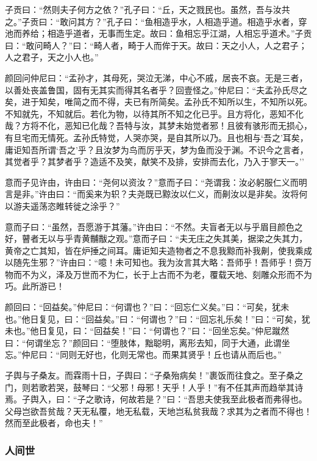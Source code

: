 \documentclass[]{article}
\begin{document}
子贡曰：``然则夫子何方之依？''孔子曰：``丘，天之戮民也。虽然，吾与汝共之。''子贡曰：``敢问其方？''孔子曰：``鱼相造乎水，人相造乎道。相造乎水者，穿池而养给；相造乎道者，无事而生定。故曰：鱼相忘乎江湖，人相忘乎道术。''子贡曰：``敢问畸人？''曰：``畸人者，畸于人而侔于天。故曰：天之小人，人之君子；人之君子，天之小人也。''

颜回问仲尼曰：``孟孙才，其母死，哭泣无涕，中心不戚，居丧不哀。无是三者，以善处丧盖鲁国，固有无其实而得其名者乎？回壹怪之。''仲尼曰：``夫孟孙氏尽之矣，进于知矣，唯简之而不得，夫已有所简矣。孟孙氏不知所以生，不知所以死。不知就先，不知就后。若化为物，以待其所不知之化已乎。且方将化，恶知不化哉？方将不化，恶知已化哉？吾特与汝，其梦未始觉者邪！且彼有骇形而无损心，有旦宅而无情死。孟孙氏特觉，人哭亦哭，是自其所以乃。且也相与`吾之'耳矣，庸讵知吾所谓`吾之'乎？且汝梦为鸟而厉乎天，梦为鱼而没于渊。不识今之言者，其觉者乎？其梦者乎？造适不及笑，献笑不及排，安排而去化，乃入于寥天一。''

意而子见许由，许由曰：``尧何以资汝？''意而子曰：``尧谓我：汝必躬服仁义而明言是非。''许由曰：``而奚来为轵？夫尧既已黥汝以仁义，而劓汝以是非矣。汝将何以游夫遥荡恣睢转徙之涂乎？''

意而子曰：``虽然，吾愿游于其藩。''许由曰：``不然。夫盲者无以与乎眉目颜色之好，瞽者无以与乎青黄黼黻之观。''意而子曰：``夫无庄之失其美，据梁之失其力，黄帝之亡其知，皆在炉捶之间耳。庸讵知夫造物者之不息我黥而补我劓，使我乘成以随先生邪？''许由曰：``噫！未可知也。我为汝言其大略：吾师乎！吾师乎！赍万物而不为义，泽及万世而不为仁，长于上古而不为老，覆载天地、刻雕众形而不为巧。此所游已！

颜回曰：``回益矣。''仲尼曰：``何谓也？''曰：``回忘仁义矣。''曰：``可矣，犹未也。''他日复见，曰：``回益矣。''曰：``何谓也？''曰：``回忘礼乐矣！''曰：``可矣，犹未也。''他日复见，曰：``回益矣！''曰：``何谓也？''曰：``回坐忘矣。''仲尼蹴然曰：``何谓坐忘？''颜回曰：``堕肢体，黜聪明，离形去知，同于大通，此谓坐忘。''仲尼曰：``同则无好也，化则无常也。而果其贤乎！丘也请从而后也。''

子舆与子桑友。而霖雨十日，子舆曰：``子桑殆病矣！''裹饭而往食之。至子桑之门，则若歌若哭，鼓琴曰：``父邪！母邪！天乎！人乎！''有不任其声而趋举其诗焉。子舆入，曰：``子之歌诗，何故若是？''曰：``吾思夫使我至此极者而弗得也。父母岂欲吾贫哉？天无私覆，地无私载，天地岂私贫我哉？求其为之者而不得也！然而至此极者，命也夫！''

\hypertarget{header-n94}{%
\subsubsection{人间世}\label{header-n94}}
\end{document}
